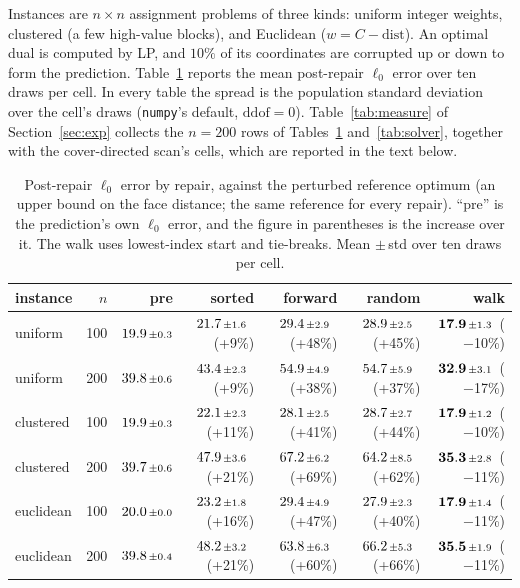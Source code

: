 Instances are $n \times n$ assignment problems of three kinds: uniform integer weights, clustered
(a few high-value blocks), and Euclidean ($w = C - \mathrm{dist}$). An optimal dual is computed by
LP, and $10\%$ of its coordinates are corrupted up or down to form the prediction.
Table~\ref{tab:exp} reports the mean post-repair $\ell_0$ error over ten draws per cell. In every
table the spread is the population standard deviation over the cell's draws (\texttt{numpy}'s
default, $\mathrm{ddof}=0$). Table~\ref{tab:measure} of Section~\ref{sec:exp} collects the $n = 200$ rows of
Tables~\ref{tab:exp} and~\ref{tab:solver}, together with the cover-directed scan's cells, which are
reported in the text below.

\begin{table}[ht]
\centering
\caption{Post-repair $\ell_0$ error by repair, against the perturbed reference optimum (an upper
bound on the face distance; the same reference for every repair). ``pre'' is the prediction's own
$\ell_0$ error, and the figure in parentheses is the increase over it. The walk uses
lowest-index start and tie-breaks. Mean ${\scriptstyle\pm}$\,std over ten draws per cell.}
\label{tab:exp}
\footnotesize
\setlength{\tabcolsep}{3pt}
\begin{tabular}{lrrrrrr}
\toprule
instance & $n$ & pre & sorted & forward & random & walk\\
\midrule
uniform   & 100 & $19.9{\scriptstyle\,\pm0.3}$ & $21.7{\scriptstyle\,\pm1.6}$ \,(+9\%) & $29.4{\scriptstyle\,\pm2.9}$ \,(+48\%) & $28.9{\scriptstyle\,\pm2.5}$ \,(+45\%) & $\mathbf{17.9}{\scriptstyle\,\pm1.3}$ \,($-$10\%)\\
uniform   & 200 & $39.8{\scriptstyle\,\pm0.6}$ & $43.4{\scriptstyle\,\pm2.3}$ \,(+9\%) & $54.9{\scriptstyle\,\pm4.9}$ \,(+38\%) & $54.7{\scriptstyle\,\pm5.9}$ \,(+37\%) & $\mathbf{32.9}{\scriptstyle\,\pm3.1}$ \,($-$17\%)\\
clustered & 100 & $19.9{\scriptstyle\,\pm0.3}$ & $22.1{\scriptstyle\,\pm2.3}$ \,(+11\%) & $28.1{\scriptstyle\,\pm2.5}$ \,(+41\%) & $28.7{\scriptstyle\,\pm2.7}$ \,(+44\%) & $\mathbf{17.9}{\scriptstyle\,\pm1.2}$ \,($-$10\%)\\
clustered & 200 & $39.7{\scriptstyle\,\pm0.6}$ & $47.9{\scriptstyle\,\pm3.6}$ \,(+21\%) & $67.2{\scriptstyle\,\pm6.2}$ \,(+69\%) & $64.2{\scriptstyle\,\pm8.5}$ \,(+62\%) & $\mathbf{35.3}{\scriptstyle\,\pm2.8}$ \,($-$11\%)\\
euclidean & 100 & $20.0{\scriptstyle\,\pm0.0}$ & $23.2{\scriptstyle\,\pm1.8}$ \,(+16\%) & $29.4{\scriptstyle\,\pm4.9}$ \,(+47\%) & $27.9{\scriptstyle\,\pm2.3}$ \,(+40\%) & $\mathbf{17.9}{\scriptstyle\,\pm1.4}$ \,($-$11\%)\\
euclidean & 200 & $39.8{\scriptstyle\,\pm0.4}$ & $48.2{\scriptstyle\,\pm3.2}$ \,(+21\%) & $63.8{\scriptstyle\,\pm6.3}$ \,(+60\%) & $66.2{\scriptstyle\,\pm5.3}$ \,(+66\%) & $\mathbf{35.5}{\scriptstyle\,\pm1.9}$ \,($-$11\%)\\
\bottomrule
\end{tabular}
\end{table}

